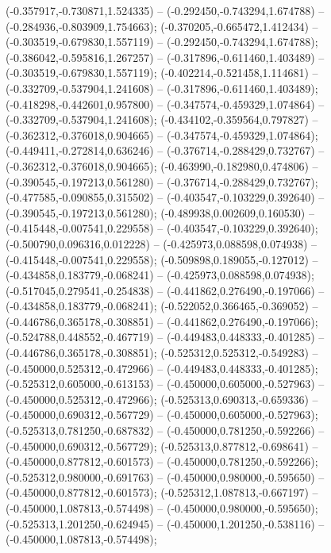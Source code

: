  (-0.357917,-0.730871,1.524335) -- (-0.292450,-0.743294,1.674788) -- (-0.284936,-0.803909,1.754663);
 (-0.370205,-0.665472,1.412434) -- (-0.303519,-0.679830,1.557119) -- (-0.292450,-0.743294,1.674788);
 (-0.386042,-0.595816,1.267257) -- (-0.317896,-0.611460,1.403489) -- (-0.303519,-0.679830,1.557119);
 (-0.402214,-0.521458,1.114681) -- (-0.332709,-0.537904,1.241608) -- (-0.317896,-0.611460,1.403489);
 (-0.418298,-0.442601,0.957800) -- (-0.347574,-0.459329,1.074864) -- (-0.332709,-0.537904,1.241608);
 (-0.434102,-0.359564,0.797827) -- (-0.362312,-0.376018,0.904665) -- (-0.347574,-0.459329,1.074864);
 (-0.449411,-0.272814,0.636246) -- (-0.376714,-0.288429,0.732767) -- (-0.362312,-0.376018,0.904665);
 (-0.463990,-0.182980,0.474806) -- (-0.390545,-0.197213,0.561280) -- (-0.376714,-0.288429,0.732767);
 (-0.477585,-0.090855,0.315502) -- (-0.403547,-0.103229,0.392640) -- (-0.390545,-0.197213,0.561280);
 (-0.489938,0.002609,0.160530) -- (-0.415448,-0.007541,0.229558) -- (-0.403547,-0.103229,0.392640);
 (-0.500790,0.096316,0.012228) -- (-0.425973,0.088598,0.074938) -- (-0.415448,-0.007541,0.229558);
 (-0.509898,0.189055,-0.127012) -- (-0.434858,0.183779,-0.068241) -- (-0.425973,0.088598,0.074938);
 (-0.517045,0.279541,-0.254838) -- (-0.441862,0.276490,-0.197066) -- (-0.434858,0.183779,-0.068241);
 (-0.522052,0.366465,-0.369052) -- (-0.446786,0.365178,-0.308851) -- (-0.441862,0.276490,-0.197066);
 (-0.524788,0.448552,-0.467719) -- (-0.449483,0.448333,-0.401285) -- (-0.446786,0.365178,-0.308851);
 (-0.525312,0.525312,-0.549283) -- (-0.450000,0.525312,-0.472966) -- (-0.449483,0.448333,-0.401285);
 (-0.525312,0.605000,-0.613153) -- (-0.450000,0.605000,-0.527963) -- (-0.450000,0.525312,-0.472966);
 (-0.525313,0.690313,-0.659336) -- (-0.450000,0.690312,-0.567729) -- (-0.450000,0.605000,-0.527963);
 (-0.525313,0.781250,-0.687832) -- (-0.450000,0.781250,-0.592266) -- (-0.450000,0.690312,-0.567729);
 (-0.525313,0.877812,-0.698641) -- (-0.450000,0.877812,-0.601573) -- (-0.450000,0.781250,-0.592266);
 (-0.525312,0.980000,-0.691763) -- (-0.450000,0.980000,-0.595650) -- (-0.450000,0.877812,-0.601573);
 (-0.525312,1.087813,-0.667197) -- (-0.450000,1.087813,-0.574498) -- (-0.450000,0.980000,-0.595650);
 (-0.525313,1.201250,-0.624945) -- (-0.450000,1.201250,-0.538116) -- (-0.450000,1.087813,-0.574498);
